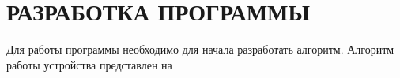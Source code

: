 \begin{sloppypar} %
\newpage %
\section{РАЗРАБОТКА ПРОГРАММЫ} %

Для работы программы необходимо для начала разработать алгоритм. Алгоритм работы устройства представлен на 




\end{sloppypar}

